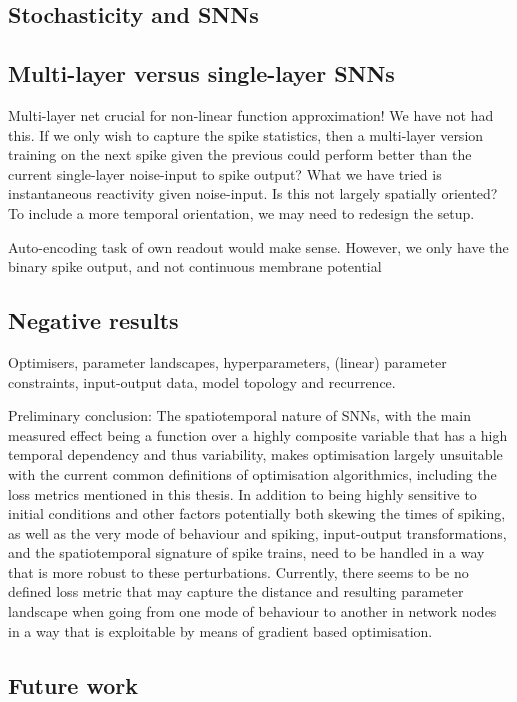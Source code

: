 \documentclass[mphil,deptreport,ianc]{infthesis} %
\begin{document}
\subsection{Stochasticity and SNNs}


\subsection*{Multi-layer versus single-layer SNNs}

Multi-layer net crucial for non-linear function approximation! We have not had this. If we only wish to capture the spike statistics, then a multi-layer version training on the next spike given the previous could perform better than the current single-layer noise-input to spike output?
What we have tried is instantaneous reactivity given noise-input. Is this not largely spatially oriented? To include a more temporal orientation, we may need to redesign the setup.

Auto-encoding task of own readout would make sense. However, we only have the binary spike output, and not continuous membrane potential


\subsection{Negative results}

Optimisers, parameter landscapes, hyperparameters, (linear) parameter constraints, input-output data, model topology and recurrence.

Preliminary conclusion: The spatiotemporal nature of SNNs, with the main measured effect being a function over a highly composite variable that has a high temporal dependency and thus variability, makes optimisation largely unsuitable with the current common definitions of optimisation algorithmics, including the loss metrics mentioned in this thesis.
In addition to being highly sensitive to initial conditions and other factors potentially both skewing the times of spiking, as well as the very mode of behaviour and spiking, input-output transformations, and the spatiotemporal signature of spike trains, need to be handled in a way that is more robust to these perturbations. 
Currently, there seems to be no defined loss metric that may capture the distance and resulting parameter landscape when going from one mode of behaviour to another in network nodes in a way that is exploitable by means of gradient based optimisation.

\subsection{Future work}
\end{document}
